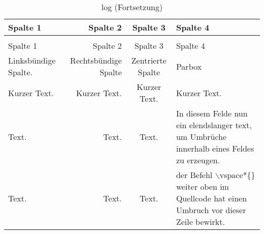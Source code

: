 \documentclass[12pt,a4paper]{article}
\begin{document}
\vspace*{10cm}

\begin{longtable}{lrcp{2cm}}
\caption{log}\label{tab:log2}\\ 
\toprule
Spalte 1 & Spalte 2 & Spalte 3 & Spalte 4\\             
\midrule
\endfirsthead
\caption[]{log \small(Fortsetzung)}\\
\toprule
Spalte 1 & Spalte 2 & Spalte 3 & Spalte 4\\
\midrule
\endhead
\midrule
\endfoot 
\bottomrule
\endlastfoot 
 Linksbündige Spalte. & Rechtsbündige Spalte &Zentrierte Spalte & Parbox\\

 Kurzer Text. & Kurzer Text. & Kurzer Text. & Kurzer Text.\\

 Text. & Text. & Text. & In diesem Felde nun ein elendslanger text, um
 Umbrüche innerhalb eines Feldes zu erzeugen.\\

Text. & Text. & Text. & der Befehl $\backslash$vspace*\{\} weiter oben im
Quellcode hat einen Umbruch vor dieser Zeile bewirkt.\\
\end{longtable}

\clearpage
\listoftables
\end{document}
